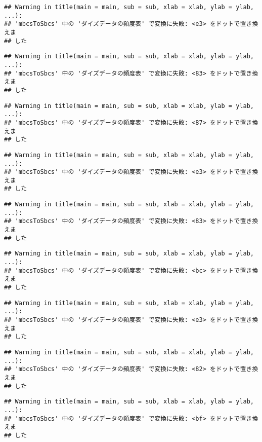 \documentclass[
]{article}
\begin{document}
\begin{verbatim}
## Warning in title(main = main, sub = sub, xlab = xlab, ylab = ylab, ...):
## 'mbcsToSbcs' 中の 'ダイズデータの頻度表' で変換に失敗: <e3> をドットで置き換えま
## した
\end{verbatim}

\begin{verbatim}
## Warning in title(main = main, sub = sub, xlab = xlab, ylab = ylab, ...):
## 'mbcsToSbcs' 中の 'ダイズデータの頻度表' で変換に失敗: <83> をドットで置き換えま
## した
\end{verbatim}

\begin{verbatim}
## Warning in title(main = main, sub = sub, xlab = xlab, ylab = ylab, ...):
## 'mbcsToSbcs' 中の 'ダイズデータの頻度表' で変換に失敗: <87> をドットで置き換えま
## した
\end{verbatim}

\begin{verbatim}
## Warning in title(main = main, sub = sub, xlab = xlab, ylab = ylab, ...):
## 'mbcsToSbcs' 中の 'ダイズデータの頻度表' で変換に失敗: <e3> をドットで置き換えま
## した
\end{verbatim}

\begin{verbatim}
## Warning in title(main = main, sub = sub, xlab = xlab, ylab = ylab, ...):
## 'mbcsToSbcs' 中の 'ダイズデータの頻度表' で変換に失敗: <83> をドットで置き換えま
## した
\end{verbatim}

\begin{verbatim}
## Warning in title(main = main, sub = sub, xlab = xlab, ylab = ylab, ...):
## 'mbcsToSbcs' 中の 'ダイズデータの頻度表' で変換に失敗: <bc> をドットで置き換えま
## した
\end{verbatim}

\begin{verbatim}
## Warning in title(main = main, sub = sub, xlab = xlab, ylab = ylab, ...):
## 'mbcsToSbcs' 中の 'ダイズデータの頻度表' で変換に失敗: <e3> をドットで置き換えま
## した
\end{verbatim}

\begin{verbatim}
## Warning in title(main = main, sub = sub, xlab = xlab, ylab = ylab, ...):
## 'mbcsToSbcs' 中の 'ダイズデータの頻度表' で変換に失敗: <82> をドットで置き換えま
## した
\end{verbatim}

\begin{verbatim}
## Warning in title(main = main, sub = sub, xlab = xlab, ylab = ylab, ...):
## 'mbcsToSbcs' 中の 'ダイズデータの頻度表' で変換に失敗: <bf> をドットで置き換えま
## した
\end{verbatim}
\end{document}
